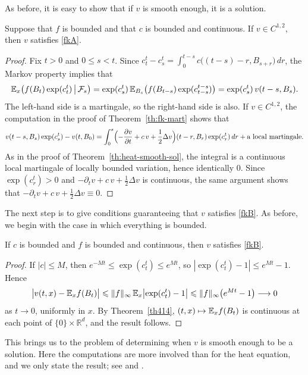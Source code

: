As before, it is easy to show that if $v$ is smooth enough, it is a solution.

\begin{theorem}\label{th:fk-smooth-sol}
	Suppose that $f$ is bounded and that $c$ is bounded and continuous. If
	$v\in C^{1,2}$, then $v$ satisfies \ref{fkA}.
\end{theorem}
\begin{proof}
	Fix $t>0$ and $0\leqslant s<t$. Since
	$c^t_t - c^t_s = \int_0^{t-s}c\bigl((t-s)-r,B_{s+r}\bigr)\,dr$, the Markov
	property implies that
	\[
		\mathbb{E}_x\bigl(f(B_t)\exp(c^t_t)\,\big|\,\mathcal{F}_s\bigr)
		= \exp(c^t_s)\,\mathbb{E}_{B_s}\bigl(f(B_{t-s})\exp(c^{t-s}_{t-s})\bigr)
		= \exp(c^t_s)\,v(t-s,B_s).
	\]
	The left-hand side is a martingale, so the right-hand side is also. If
	$v\in C^{1,2}$, the computation in the proof of Theorem~\ref{th:fk-mart}
	shows that
	\[
		v(t-s,B_s)\exp(c^t_s) - v(t,B_0)
		= \int_0^s\Bigl(-\frac{\partial v}{\partial t} + c\,v
		+ \frac{1}{2}\Delta v\Bigr)(t-r,B_r)\exp(c^t_r)\,dr
		+ \text{a local martingale.}
	\]
	As in the proof of Theorem~\ref{th:heat-smooth-sol}, the integral is a
	continuous local martingale of locally bounded variation, hence identically
	$0$. Since $\exp(c^t_r)>0$ and
	$-\partial_t v + c\,v + \frac{1}{2}\Delta v$ is continuous, the same
	argument shows that $-\partial_t v + c\,v + \frac{1}{2}\Delta v\equiv0$.
\end{proof}

The next step is to give conditions guaranteeing that $v$ satisfies
\ref{fkB}. As before, we begin with the case in which everything is bounded.

\begin{theorem}\label{th:fk-bc}
	If $c$ is bounded and $f$ is bounded and continuous, then $v$ satisfies
	\ref{fkB}.
\end{theorem}
\begin{proof}
	If $|c|\leqslant M$, then $e^{-Mt}\leqslant\exp(c^t_t)\leqslant e^{Mt}$,
	so $|\exp(c^t_t)-1|\leqslant e^{Mt}-1$. Hence
	\[
		\bigl|v(t,x) - \mathbb{E}_x f(B_t)\bigr|
		\leqslant\|f\|_\infty\,\mathbb{E}_x\bigl|\exp(c^t_t)-1\bigr|
		\leqslant\|f\|_\infty\bigl(e^{Mt}-1\bigr)\longrightarrow 0
	\]
	as $t\to0$, uniformly in $x$. By Theorem~\ref{th414},
	$(t,x)\mapsto\mathbb{E}_x f(B_t)$ is continuous at each point of
	$\{0\}\times\mathbb{R}^d$, and the result follows.
\end{proof}

This brings us to the problem of determining when $v$ is smooth enough to be a
solution. Here the computations are more involved than for the heat equation,
and we only state the result; see \citet{Durrett1996} and
\citet{Friedman1964}.

